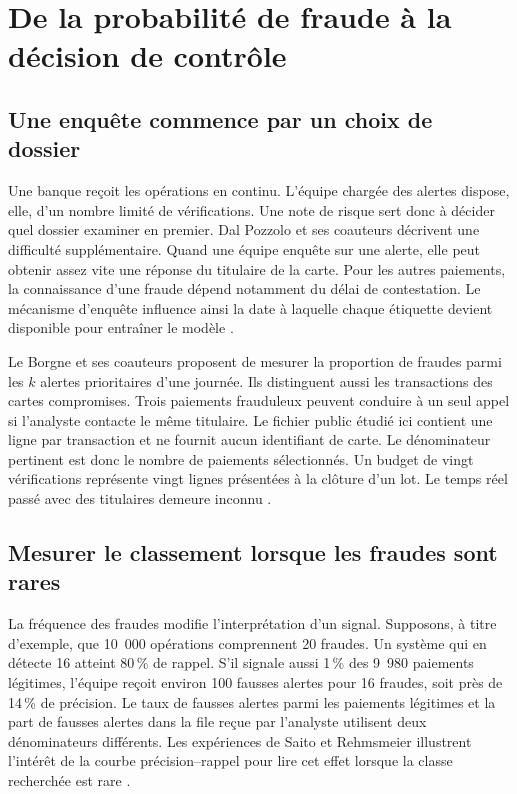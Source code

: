 \documentclass[11pt,a4paper]{article}
\begin{document}
\clearpage
\section{De la probabilité de fraude à la décision de contrôle}
\label{sec:litterature}

\subsection{Une enquête commence par un choix de dossier}

Une banque reçoit les opérations en continu. L'équipe chargée des alertes dispose, elle, d'un nombre limité de vérifications. Une note de risque sert donc à décider quel dossier examiner en premier. Dal Pozzolo et ses coauteurs décrivent une difficulté supplémentaire. Quand une équipe enquête sur une alerte, elle peut obtenir assez vite une réponse du titulaire de la carte. Pour les autres paiements, la connaissance d'une fraude dépend notamment du délai de contestation. Le mécanisme d'enquête influence ainsi la date à laquelle chaque étiquette devient disponible pour entraîner le modèle \cite{dalpozzolo2018}.

Le Borgne et ses coauteurs proposent de mesurer la proportion de fraudes parmi les $k$ alertes prioritaires d'une journée. Ils distinguent aussi les transactions des cartes compromises. Trois paiements frauduleux peuvent conduire à un seul appel si l'analyste contacte le même titulaire. Le fichier public étudié ici contient une ligne par transaction et ne fournit aucun identifiant de carte. Le dénominateur pertinent est donc le nombre de paiements sélectionnés. Un budget de vingt vérifications représente vingt lignes présentées à la clôture d'un lot. Le temps réel passé avec des titulaires demeure inconnu \cite{leborgne2022}.

\subsection{Mesurer le classement lorsque les fraudes sont rares}

La fréquence des fraudes modifie l'interprétation d'un signal. Supposons, à titre d'exemple, que 10~000 opérations comprennent 20 fraudes. Un système qui en détecte 16 atteint 80\,\% de rappel. S'il signale aussi 1\,\% des 9~980 paiements légitimes, l'équipe reçoit environ 100 fausses alertes pour 16 fraudes, soit près de 14\,\% de précision. Le taux de fausses alertes parmi les paiements légitimes et la part de fausses alertes dans la file reçue par l'analyste utilisent deux dénominateurs différents. Les expériences de Saito et Rehmsmeier illustrent l'intérêt de la courbe précision--rappel pour lire cet effet lorsque la classe recherchée est rare \cite{saito2015}.
\end{document}
